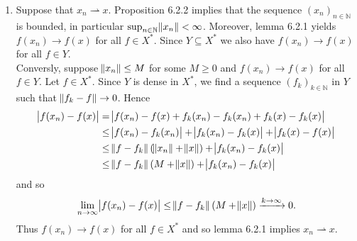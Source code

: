 \begin{enumerate}[label = \textbf{Exercise \arabic*.},wide = 0pt, itemsep = 1.5ex]
\begin{enumerate}[label = \textbf{\alph*.},wide = 0pt, itemsep = 1.5ex]
\begin{proof}
					Let $U \in \mathcal{T}$. Then $U = \cup_{\alpha \in A}B_\alpha$ for some index set $A$ and $B_\alpha \in \mathcal{B}$ for all $\alpha \in A$. But each $B_\alpha$ is a finite intersection of elements of $\mathcal{\altS}$ and thus since $\mathcal{T}_\mathcal{F}$ is a topology containing $\mathcal{\altS}$, we have that $B_\alpha \in \mathcal{T}_\mathcal{F}$ for all $\alpha \in A$. But then also $U \in \mathcal{T}_\mathcal{F}$ as a union of sets in $\mathcal{T}_\mathcal{F}$. Hence $\mathcal{T} \subseteq \mathcal{T}_\mathcal{F}$. 
				\end{proof}
		\end{enumerate}
	\item Suppose that $x_n \rightharpoonup x$. Proposition 6.2.2 implies that the sequence $(x_n)_{n \in \mathbb{N}}$ is bounded, in particular $\sup_{n \in \mathbb{N}} \norm{x_n} < \infty$. Moreover, lemma 6.2.1 yields $f(x_n) \to f(x)$ for all $f \in X^*$. Since $Y \subseteq X^*$ we also have $f(x_n) \to f(x)$ for all $f \in Y$.\\
		Conversly, suppose $\norm{x_n} \leq M$ for some $M \geq 0$ and $f(x_n) \to f(x)$ for all $f \in Y$. Let $f \in X^*$. Since $Y$ is dense in $X^*$, we find a sequence $(f_k)_{k \in \mathbb{N}}$ in $Y$ such that $\norm{f_k - f} \to 0$. Hence
		\begin{align*}
			\abs{f(x_n) - f(x)} &= \abs{f(x_n) - f(x) + f_k(x_n) - f_k(x_n) + f_k(x) - f_k(x)}\\
			&\leq \abs{f(x_n) - f_k(x_n)} + \abs{f_k(x_n) - f_k(x)} + \abs{f_k(x) - f(x)}\\
			&\leq \norm{f - f_k}\del[0]{\norm{x_n} + \norm{x}} + \abs{f_k(x_n) - f_k(x)}\\
			&\leq \norm{f - f_k}\del[0]{M + \norm{x}} + \abs{f_k(x_n) - f_k(x)}\\
		\end{align*}
		\noindent and so
		\begin{equation*}
			\lim_{n \to \infty} \abs{f(x_n) - f(x)} \leq \norm{f - f_k}\del[0]{M + \norm{x}} \xrightarrow{k \to \infty} 0.
		\end{equation*}
		Thus $f(x_n) \to f(x)$ for all $f \in X^*$ and so lemma 6.2.1 implies $x_n \rightharpoonup x$.
\end{enumerate}
\printbibliography

